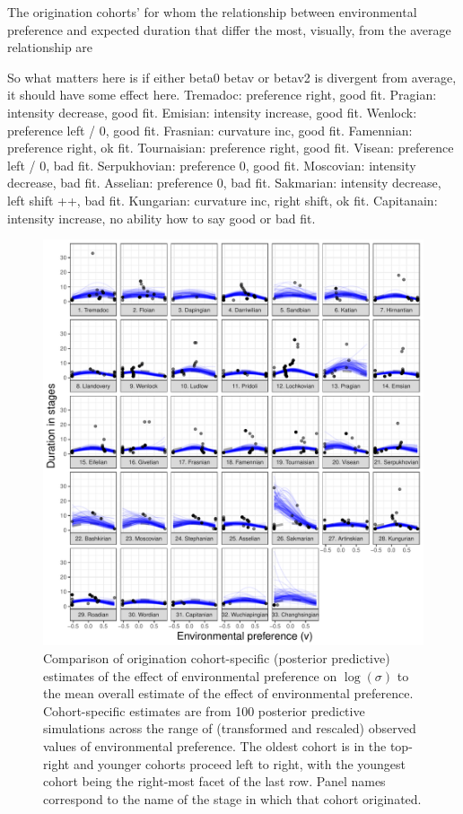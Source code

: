 \documentclass[11pt]{article}
\begin{document}
The origination cohorts' for whom the relationship between environmental preference and expected duration that differ the most, visually, from the average relationship are 

So what matters here is if either beta0 betav or betav2 is divergent from average, it should have some effect here.
Tremadoc: preference right, good fit.
Pragian: intensity decrease, good fit.
Emisian: intensity increase, good fit.
Wenlock: preference left / 0, good fit.
Frasnian: curvature inc, good fit.
Famennian: preference right, ok fit.
Tournaisian: preference right, good fit.
Visean: preference left / 0, bad fit.
Serpukhovian: preference 0, good fit.
Moscovian: intensity decrease, bad fit.
Asselian: preference 0, bad fit.
Sakmarian: intensity decrease, left shift ++, bad fit.
Kungarian: curvature inc, right shift, ok fit.
Capitanain: intensity increase, no ability how to say good or bad fit.




\begin{figure}[ht]
  \centering
  \includegraphics[width = \textwidth,height = 0.8\textheight,keepaspectratio=true]{figure/env_cohort_med_cweib_cens}
  \caption{Comparison of origination cohort-specific (posterior predictive) estimates of the effect of environmental preference on \(\log(\sigma)\) to the mean overall estimate of the effect of environmental preference. Cohort-specific estimates are from 100 posterior predictive simulations across the range of (transformed and rescaled) observed values of environmental preference. The oldest cohort is in the top-right and younger cohorts proceed left to right, with the youngest cohort being the right-most facet of the last row. Panel names correspond to the name of the stage in which that cohort originated.}
  \label{fig:env_cohort}
\end{figure}
\end{document}
